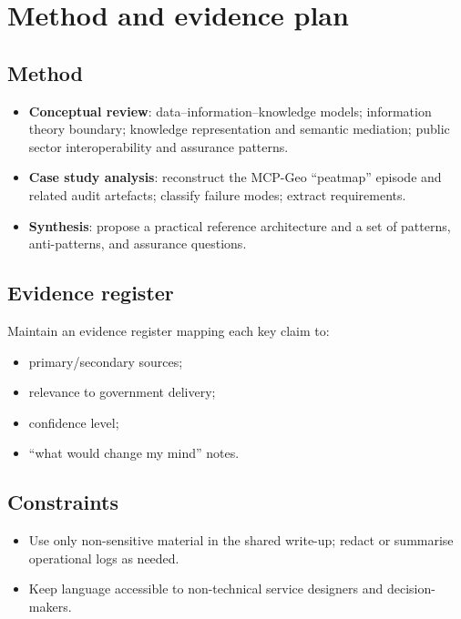 \section{Method and evidence plan}

\subsection{Method}
\begin{itemize}[leftmargin=*]
  \item \textbf{Conceptual review}: data--information--knowledge models; information theory boundary; knowledge representation and semantic mediation; public sector interoperability and assurance patterns.
  \item \textbf{Case study analysis}: reconstruct the MCP-Geo ``peatmap'' episode and related audit artefacts; classify failure modes; extract requirements.
  \item \textbf{Synthesis}: propose a practical reference architecture and a set of patterns, anti-patterns, and assurance questions.
\end{itemize}

\subsection{Evidence register}
Maintain an evidence register mapping each key claim to:
\begin{itemize}[leftmargin=*]
  \item primary/secondary sources;
  \item relevance to government delivery;
  \item confidence level;
  \item ``what would change my mind'' notes.
\end{itemize}

\subsection{Constraints}
\begin{itemize}[leftmargin=*]
  \item Use only non-sensitive material in the shared write-up; redact or summarise operational logs as needed.
  \item Keep language accessible to non-technical service designers and decision-makers.
\end{itemize}
